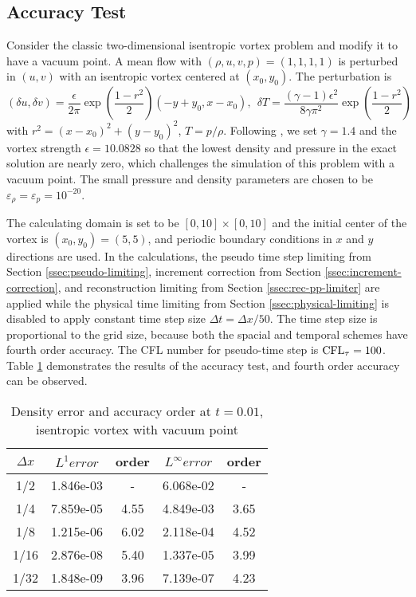 \subsection{Accuracy Test}

Consider the classic two-dimensional isentropic vortex problem \cite{hu1999weighted_WENO}
and modify it to have a vacuum point.
A mean flow
with $(\rho, u, v, p)=(1,1,1,1)$ is perturbed in $(u,v)$
with an isentropic vortex centered at $(x_0,y_0)$.
The perturbation is
$$
    (\delta u, \delta v) = \frac{\epsilon}{2\pi} \exp(\frac{1-r^2}{2}) (-y+y_0, x-x_0),\ \
    \delta T = \frac{(\gamma-1)\epsilon^2}{8\gamma \pi^2}\exp(\frac{1-r^2}{2})
$$
with $r^2=(x-x_0)^2+(y-y_0)^2$, $T=p/\rho$.
Following \cite{zhang2012positivity},
we set $\gamma=1.4$ and the vortex strength $\epsilon = 10.0828$ so that
the lowest density and pressure in the exact solution are nearly zero,
which challenges the simulation of this problem with a vacuum point.
The small pressure and density parameters are chosen to be $\varepsilon_\rho = \varepsilon_p = 10^{-20}$.

The calculating domain is set to be $[0,10]\times[0,10]$ and the initial center of
the vortex is $(x_0,y_0)=(5,5)$, and periodic boundary conditions in $x$ and $y$ directions are used.
In the calculations, the pseudo time step limiting from Section \ref{ssec:pseudo-limiting},
increment correction from Section \ref{ssec:increment-correction},
and reconstruction limiting from Section \ref{ssec:rec-pp-limiter} are applied
while the physical time limiting from Section \ref{ssec:physical-limiting}
is disabled to apply constant time step size $\Delta t = \Delta x/50$.
The time step size is proportional to the grid size, because both the
spacial and temporal schemes have fourth order accuracy.
The CFL number for pseudo-time step is $\text{CFL}_\tau = 100$.
Table \ref{tab:ivResults} demonstrates the results of the accuracy test, and
fourth order accuracy can be observed.

\begin{table}[htbp]
    \centering
    \footnotesize
    \begin{tabular}{|c|c|c|c|c|}
        \hline
        $\Delta x$ & $L^1 error$ & order & $L^\infty error$ & order \\
        \hline
        1/2        & 1.846e-03   & -     & 6.068e-02        & -     \\
        \hline
        1/4        & 7.859e-05   & 4.55  & 4.849e-03        & 3.65  \\
        \hline
        1/8        & 1.215e-06   & 6.02  & 2.118e-04        & 4.52  \\
        \hline
        1/16       & 2.876e-08   & 5.40  & 1.337e-05        & 3.99  \\
        \hline
        1/32       & 1.848e-09   & 3.96  & 7.139e-07        & 4.23  \\
        \hline
    \end{tabular}
    \caption{Density error and accuracy order at $t=0.01$, isentropic vortex with vacuum point}
    \label{tab:ivResults}
\end{table}

